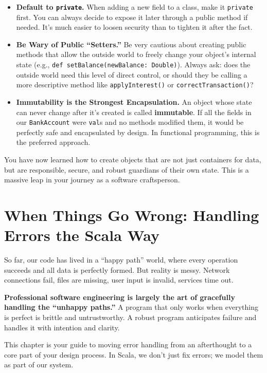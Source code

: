 \documentclass[
  letterpaper,
  DIV=11,
  numbers=noendperiod]{scrreprt}
\providecommand{\tightlist}{%
  \setlength{\itemsep}{0pt}\setlength{\parskip}{0pt}}
\begin{document}
\begin{itemize}
\tightlist
\item
  \textbf{Default to \texttt{private}.} When adding a new field to a
  class, make it \texttt{private} first. You can always decide to expose
  it later through a public method if needed. It's much easier to loosen
  security than to tighten it after the fact.
\item
  \textbf{Be Wary of Public ``Setters.''} Be very cautious about
  creating public methods that allow the outside world to freely change
  your object's internal state (e.g.,
  \texttt{def\ setBalance(newBalance:\ Double)}). Always ask: does the
  outside world need this level of direct control, or should they be
  calling a more descriptive method like \texttt{applyInterest()} or
  \texttt{correctTransaction()}?
\item
  \textbf{Immutability is the Strongest Encapsulation.} An object whose
  state can never change after it's created is called
  \textbf{immutable}. If all the fields in our \texttt{BankAccount} were
  \texttt{val}s and no methods modified them, it would be perfectly safe
  and encapsulated by design. In functional programming, this is the
  preferred approach.
\end{itemize}

You have now learned how to create objects that are not just containers
for data, but are responsible, secure, and robust guardians of their own
state. This is a massive leap in your journey as a software
craftsperson.


\chapter{When Things Go Wrong: Handling Errors the Scala
Way}\label{when-things-go-wrong-handling-errors-the-scala-way}

So far, our code has lived in a ``happy path'' world, where every
operation succeeds and all data is perfectly formed. But reality is
messy. Network connections fail, files are missing, user input is
invalid, services time out.

\textbf{Professional software engineering is largely the art of
gracefully handling the ``unhappy paths.''} A program that only works
when everything is perfect is brittle and untrustworthy. A robust
program anticipates failure and handles it with intention and clarity.

This chapter is your guide to moving error handling from an afterthought
to a core part of your design process. In Scala, we don't just fix
errors; we model them as part of our system.
\end{document}
